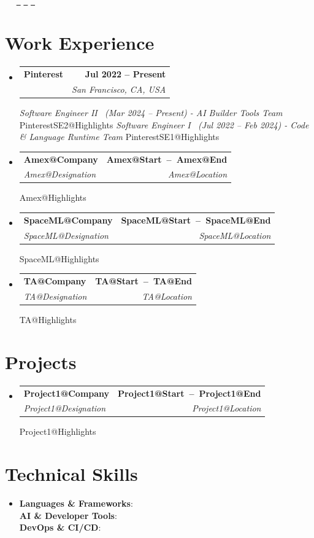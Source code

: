 \documentclass[letterpaper,11pt]{article}
\makeatletter
\newcommand{\resumeSubheading}[4]{
  \vspace{-2pt}\item
    \begin{tabular*}{1.0\textwidth}[t]{l@{\extracolsep{\fill}}r}
      \textbf{#1} & \textbf{\small #2} \\
      \textit{\small#3} & \textit{\small #4} \\
    \end{tabular*}\vspace{-7pt}
}
\newcommand{\resumeSubHeadingListStart}{\begin{itemize}[leftmargin=0.0in, label={}]}
\newcommand{\resumeSubHeadingListEnd}{\end{itemize}}
\def\titlesection{
\begin{center}
    {\Huge \scshape \firstname \ \lastname} \\ \vspace{1pt}
    \small \raisebox{-0.1\height}\faPhone\ \jasphone ~ \href{mailto:\email}{\raisebox{-0.2\height}\faEnvelope\  \underline{\email}}
    \href{\linkedinurl}{\raisebox{-0.2\height}\faLinkedin\ \underline{\linkedintext}}
    \href{\githuburl}{\raisebox{-0.2\height}\faGithub\ \underline{\githubtext}}
    \vspace{-8pt}
\end{center}
}
\makeatother
\begin{document}
\titlesection

\newcommand{\renderExp}[1]{
\resumeSubheading
      {\csname #1@Company\endcsname}{\csname #1@Start\endcsname\ --\ \csname #1@End\endcsname}
      {\csname #1@Designation\endcsname}{\csname #1@Location\endcsname}
      \csname #1@Highlights\endcsname
}

\newcommand{\renderPinterest}{
  \vspace{-2pt}\item
  \begin{tabular*}{1.0\textwidth}[t]{l@{\extracolsep{\fill}}r}
    \textbf{Pinterest} & \textbf{\small Jul 2022 -- Present} \\
    \hfill & \textit{\small San Francisco, CA, USA} \\
  \end{tabular*}\vspace{-12pt}
  \textit{\small Software Engineer II \, (Mar 2024 -- Present) - AI Builder Tools Team}\vspace{-4pt}
  \csname PinterestSE2@Highlights\endcsname
  \vspace{2pt}
  \textit{\small Software Engineer I \, (Jul 2022 -- Feb 2024) - Code \& Language Runtime Team}\vspace{-2pt}
  \csname PinterestSE1@Highlights\endcsname
}

\section{Work Experience}
    \resumeSubHeadingListStart
        \renderPinterest
        \renderExp{Amex}
        \renderExp{SpaceML}
        \renderExp{TA}
  \resumeSubHeadingListEnd

\section{Projects}
\resumeSubHeadingListStart
    \renderExp{Project1}
\resumeSubHeadingListEnd

\section{Technical Skills}
  \resumeSubHeadingListStart
    \item\small{
      \textbf{Languages \& Frameworks}{: \skillsLanguagesFrameworks} \\[2pt]
      \textbf{AI \& Developer Tools}{: \skillsDevAiTools}  \\[2pt]
      \textbf{DevOps \& CI/CD}{: \skillsDevOpsCiCd}  \\[2pt]
    }
  \resumeSubHeadingListEnd
\vspace{-14pt}
\end{document}

